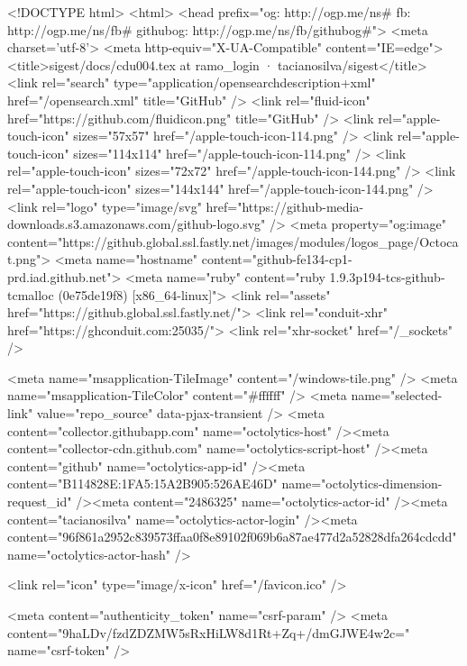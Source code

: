 


<!DOCTYPE html>
<html>
  <head prefix="og: http://ogp.me/ns# fb: http://ogp.me/ns/fb# githubog: http://ogp.me/ns/fb/githubog#">
    <meta charset='utf-8'>
    <meta http-equiv="X-UA-Compatible" content="IE=edge">
        <title>sigest/docs/cdu004.tex at ramo_login · tacianosilva/sigest</title>
    <link rel="search" type="application/opensearchdescription+xml" href="/opensearch.xml" title="GitHub" />
    <link rel="fluid-icon" href="https://github.com/fluidicon.png" title="GitHub" />
    <link rel="apple-touch-icon" sizes="57x57" href="/apple-touch-icon-114.png" />
    <link rel="apple-touch-icon" sizes="114x114" href="/apple-touch-icon-114.png" />
    <link rel="apple-touch-icon" sizes="72x72" href="/apple-touch-icon-144.png" />
    <link rel="apple-touch-icon" sizes="144x144" href="/apple-touch-icon-144.png" />
    <link rel="logo" type="image/svg" href="https://github-media-downloads.s3.amazonaws.com/github-logo.svg" />
    <meta property="og:image" content="https://github.global.ssl.fastly.net/images/modules/logos_page/Octocat.png">
    <meta name="hostname" content="github-fe134-cp1-prd.iad.github.net">
    <meta name="ruby" content="ruby 1.9.3p194-tcs-github-tcmalloc (0e75de19f8) [x86_64-linux]">
    <link rel="assets" href="https://github.global.ssl.fastly.net/">
    <link rel="conduit-xhr" href="https://ghconduit.com:25035/">
    <link rel="xhr-socket" href="/_sockets" />
    


    <meta name="msapplication-TileImage" content="/windows-tile.png" />
    <meta name="msapplication-TileColor" content="#ffffff" />
    <meta name="selected-link" value="repo_source" data-pjax-transient />
    <meta content="collector.githubapp.com" name="octolytics-host" /><meta content="collector-cdn.github.com" name="octolytics-script-host" /><meta content="github" name="octolytics-app-id" /><meta content="B114828E:1FA5:15A2B905:526AE46D" name="octolytics-dimension-request_id" /><meta content="2486325" name="octolytics-actor-id" /><meta content="tacianosilva" name="octolytics-actor-login" /><meta content="96f861a2952c839573ffaa0f8e89102f069b6a87ae477d2a52828dfa264cdcdd" name="octolytics-actor-hash" />
    

    
    
    <link rel="icon" type="image/x-icon" href="/favicon.ico" />

    <meta content="authenticity_token" name="csrf-param" />
<meta content="9haLDv/fzdZDZMW5sRxHiLW8d1Rt+Zq+/dmGJWE4w2c=" name="csrf-token" />

